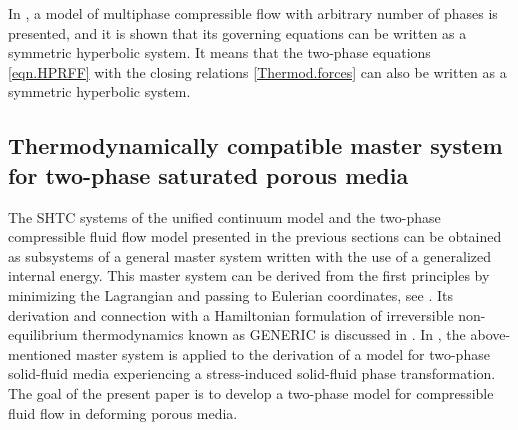 \documentclass[3p,times,table]{article}
\begin{document}
In \cite{Romenski2016}, a model of multiphase compressible flow with 
arbitrary number of phases is presented, and it is shown that its governing 
equations can be written as a symmetric hyperbolic system.
It means that the two-phase equations \eqref{eqn.HPRFF} with the closing 
relations \eqref{Thermod.forces} can also be written as a symmetric hyperbolic 
system.

\subsection{Thermodynamically compatible master system for two-phase saturated porous media}

The SHTC systems of the unified continuum model and the two-phase compressible fluid flow model presented in 
the previous sections can be obtained as subsystems of a general master 
system written with the use 
of a generalized internal energy. This master system can 
be derived from the first principles by 
minimizing the Lagrangian and passing to  Eulerian coordinates, see 
\cite{SHTC-GENERIC-CMAT}.  Its derivation and connection with a Hamiltonian 
formulation of irreversible non-equilibrium thermodynamics known as GENERIC is 
discussed in \cite{SHTC-GENERIC-CMAT}. In 
\cite{PeshGrmRom2015}, the above-mentioned master system is applied to the derivation 
of a model for 
two-phase solid-fluid media experiencing a stress-induced solid-fluid phase 
transformation. The goal of the present 
paper is to develop a two-phase model for compressible fluid flow in deforming porous media.
\end{document}
